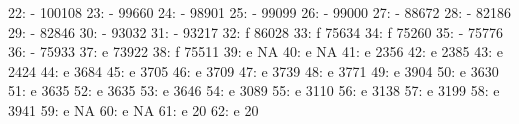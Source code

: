 \documentclass[nojss]{jss}
\begin{document}
\begin{Schunk}
\begin{Soutput}
 22:                               -                     100108
 23:                               -                      99660
 24:                               -                      98901
 25:                               -                      99099
 26:                               -                      99000
 27:                               -                      88672
 28:                               -                      82186
 29:                               -                      82846
 30:                               -                      93032
 31:                               -                      93217
 32:                               f                      86028
 33:                               f                      75634
 34:                               f                      75260
 35:                               -                      75776
 36:                               -                      75933
 37:                               e                      73922
 38:                               f                      75511
 39:                               e                         NA
 40:                               e                         NA
 41:                               e                       2356
 42:                               e                       2385
 43:                               e                       2424
 44:                               e                       3684
 45:                               e                       3705
 46:                               e                       3709
 47:                               e                       3739
 48:                               e                       3771
 49:                               e                       3904
 50:                               e                       3630
 51:                               e                       3635
 52:                               e                       3635
 53:                               e                       3646
 54:                               e                       3089
 55:                               e                       3110
 56:                               e                       3138
 57:                               e                       3199
 58:                               e                       3941
 59:                               e                         NA
 60:                               e                         NA
 61:                               e                         20
 62:                               e                         20

\end{Soutput}
\end{Schunk}
\end{document}

